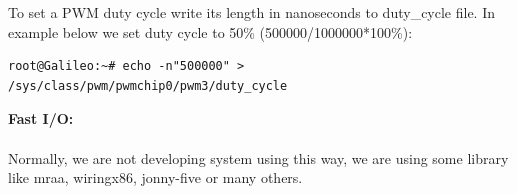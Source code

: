 \documentclass[11pt,a4paper]{article}
\newcommand\tab[1][1cm]{\hspace*{#1}}
\begin{document}
To set a PWM duty cycle write its length in nanoseconds to duty\_cycle file. In example below we set duty cycle to 50\% (500000/1000000*100\%):


\begin{lstlisting}
root@Galileo:~# echo -n"500000" > /sys/class/pwm/pwmchip0/pwm3/duty_cycle
\end{lstlisting}

\vspace{.3cm}
\large{\textbf{Fast I/O:}}
\vspace{.1cm}\\
\tab{Galileo supports fast I/O on digital pins 2 and 3 which can be connected using multiplexer directly to Intel Quark X1000}\\

\vspace{.3cm}
Normally, we are not developing system using this way, we are using some library like mraa, wiringx86, jonny-five or many others.
\end{document}

